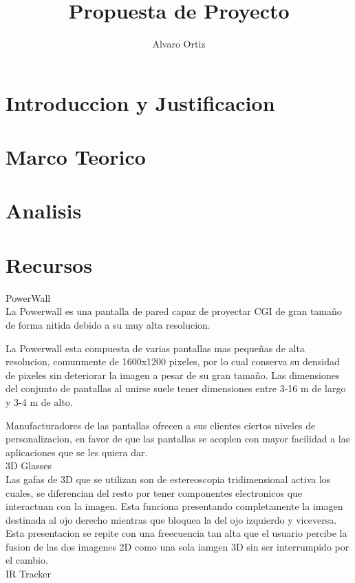 \documentclass[11pt]{article} %
\title{Propuesta de Proyecto}
\author{Alvaro Ortiz}
\begin{document}
\maketitle

\section{Introduccion y Justificacion}
\section{Marco Teorico}
\section{Analisis}
\section {Recursos}

PowerWall\\
La Powerwall es una pantalla de pared capaz de proyectar CGI de gran tamaño de forma nitida debido a su muy alta resolucion.

La Powerwall esta compuesta de varias pantallas mas pequeñas de alta resolucion, comunmente de 1600x1200 pixeles, por lo cual conserva su densidad de pixeles sin deteriorar la imagen a pesar de su gran tamaño. Las dimensiones del conjunto de pantallas al unirse suele tener dimensiones entre 3-16 m de largo y 3-4 m de alto.

Manufacturadores de las pantallas ofrecen a sus clientes ciertos niveles de personalizacion, en favor de que las pantallas se acoplen con mayor facilidad a las aplicaciones que se les quiera dar.\\

3D Glasses\\
Las gafas de 3D que se utilizan son de estereoscopia tridimensional activa los cuales, se diferencian del resto por tener componentes electronicos que interactuan con la imagen. Esta funciona presentando completamente la imagen destinada al ojo derecho mientras que bloquea la del ojo izquierdo y viceversa. Esta presentacion se repite con una freecuencia tan alta que el usuario percibe la fusion de las dos imagenes 2D como una sola iamgen 3D sin ser interrumpido por el cambio.\\

IR Tracker\\
\end{document}
